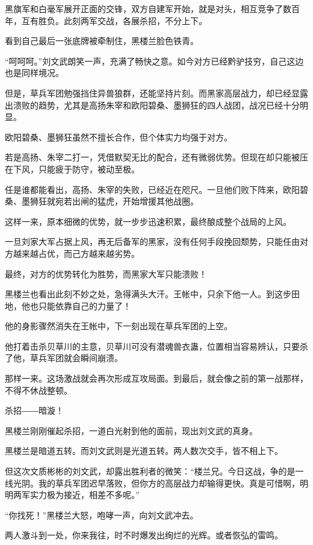 
\begin{this_body}

黑旗军和白毫军展开正面的交锋，双方自建军开始，就是对头，相互竞争了数百年，互有胜负。此刻两军交战，各展杀招，不分上下。

看到自己最后一张底牌被牵制住，黑楼兰脸色铁青。

“呵呵呵。”刘文武朗笑一声，充满了畅快之意。如今对方已经黔驴技穷，自己这边也是同样境况。

但是，草兵军团勉强挡住异兽狼群，还能坚持片刻。而黑家高层战力，却已经显露出溃败的趋势，尤其是高扬朱宰和欧阳碧桑、墨狮狂的四人战团，战况已经十分明显。

欧阳碧桑、墨狮狂虽然不擅长合作，但个体实力均强于对方。

若是高扬、朱宰二打一，凭借默契无比的配合，还有微弱优势。但现在却只能被压在下风，只能疲于防守，被动至极。

任是谁都能看出，高扬、朱宰的失败，已经近在咫尺。一旦他们败下阵来，欧阳碧桑、墨狮狂就宛若出闸的猛虎，开始增援其他战圈。

这样一来，原本细微的优势，就一步步迅速积累，最终酿成整个战局的上风。

一旦刘家大军占据上风，再无后备军的黑家，没有任何手段挽回颓势，只能任由对方越来越占优，而己方越来越劣势。

最终，对方的优势转化为胜势，而黑家大军只能溃败！

黑楼兰也看出此刻不妙之处，急得满头大汗。王帐中，只余下他一人。到这步田地，他也只能依靠自己的力量了！

他的身影骤然消失在王帐中，下一刻出现在草兵军团的上空。

他打着击杀贝草川的主意，贝草川可没有潜魂兽衣蛊，位置相当容易辨认，只要杀了他，草兵军团就会瞬间崩溃。

那样一来。这场激战就会再次形成互攻局面。到最后，就会像之前的第一战那样，不得不休战整顿。

杀招――暗漩！

黑楼兰刚刚催起杀招，一道白光射到他的面前，现出刘文武的真身。

黑楼兰是暗道五转。而刘文武则是光道五转。两人数次交手，皆不相上下。

但这次文质彬彬的刘文武，却露出胜利者的微笑：“楼兰兄。今日这战，争的是一线光阴。我的草兵军团迟早落败，但你方的高层战力却输得更快。真是可惜啊，明明两军实力极为接近，相差不多呢。”

“你找死！”黑楼兰大怒，咆哮一声，向刘文武冲去。

两人激斗到一处，你来我往，时不时爆发出绚烂的光辉。或者恢弘的雷鸣。


\end{this_body}
